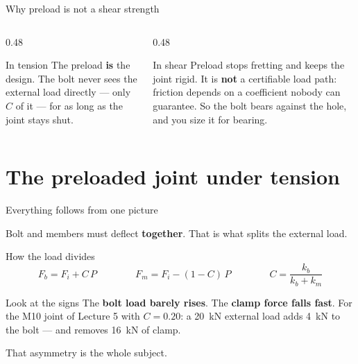 \documentclass[aspectratio=169,10pt]{beamer}
\begin{document}
\begin{frame}{Why preload is not a shear strength}
\begin{columns}[T]
\begin{column}{0.48\textwidth}
\begin{block}{In tension}
The preload \textbf{is} the design. The bolt never sees the external load directly --- only $C$ of
it --- for as long as the joint stays shut.
\end{block}
\end{column}
\begin{column}{0.48\textwidth}
\begin{alertblock}{In shear}
Preload stops fretting and keeps the joint rigid. It is \textbf{not} a certifiable load path:
friction depends on a coefficient nobody can guarantee.
\vspace{2pt}
So the bolt bears against the hole, and you size it for bearing.
\end{alertblock}
\end{column}
\end{columns}
\end{frame}

\section{The preloaded joint under tension}

\begin{frame}{Everything follows from one picture}
\centering
\resizebox{!}{5.5cm}{}
\vfill
\raggedright
Bolt and members must deflect \textbf{together}. That is what splits the external load.
\end{frame}

\begin{frame}{How the load divides}
\[
F_b = F_i + C\,P
\qquad\qquad
F_m = F_i - (1-C)\,P
\qquad\qquad
C=\frac{k_b}{k_b+k_m}
\]
\vfill
\begin{alertblock}{Look at the signs}
The \textbf{bolt load barely rises}. The \textbf{clamp force falls fast}.
\vspace{2pt}
For the M10 joint of Lecture 5 with $C=0.20$: a \SI{20}{kN} external load adds \SI{4}{kN} to the
bolt --- and removes \SI{16}{kN} of clamp.
\end{alertblock}
\vfill
\centering
That asymmetry is the whole subject.
\end{frame}
\end{document}

